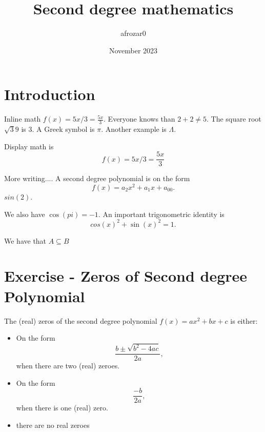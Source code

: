 \documentclass{article}
\title{Second degree mathematics}
\author{afrozar0 }
\date{November 2023}
\begin{document}
\maketitle

\section{Introduction}

Inline math $f(x)= 5x/3 = \frac{5x}{3}$. Everyone knows than $2 + 2\neq 5$. The square root $\sqrt{3}{9}$ is $3$. A Greek symbol is $\pi$. Another example is $\Lambda$. 

Display math is \[f(x)= 5x/3 = \frac{5x}{3}\]

More writing.... A second degree polynomial is on the form 
\[f(x) = a_{2} x^{2} + a_{1}x + a_{00}.\]
$sin(2)$. 

We also have $\cos(pi) = -1$. An important trigonometric identity is \[cos(x)^{2} + \sin(x)^{2}=1.\]

We have that $A \subseteq B$

\section{Exercise - Zeros of Second degree Polynomial}

The (real) zeros of the second degree polynomial $f(x)= ax^2 + bx + c$
is either:

\begin{itemize}
    \item On the form
    \[\frac{b \pm \sqrt{b^{2}-4ac}}{2a},\]
    when there are two (real) zeroes.
    \item On the form
    \[\frac{-b}{2a},\]
    when there is one (real) zero.
    \item there are no real zeroes
    
\end{itemize}
\end{document}
